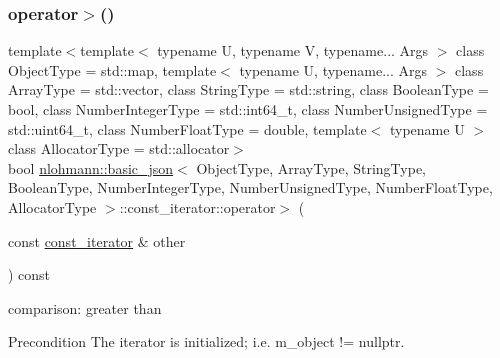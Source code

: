 \subsubsection{\texorpdfstring{operator$>$()}{operator>()}}
{\footnotesize\ttfamily template$<$template$<$ typename U, typename V, typename... Args $>$ class Object\+Type = std\+::map, template$<$ typename U, typename... Args $>$ class Array\+Type = std\+::vector, class String\+Type  = std\+::string, class Boolean\+Type  = bool, class Number\+Integer\+Type  = std\+::int64\+\_\+t, class Number\+Unsigned\+Type  = std\+::uint64\+\_\+t, class Number\+Float\+Type  = double, template$<$ typename U $>$ class Allocator\+Type = std\+::allocator$>$ \\
bool \hyperlink{classnlohmann_1_1basic__json}{nlohmann\+::basic\+\_\+json}$<$ Object\+Type, Array\+Type, String\+Type, Boolean\+Type, Number\+Integer\+Type, Number\+Unsigned\+Type, Number\+Float\+Type, Allocator\+Type $>$\+::const\+\_\+iterator\+::operator$>$ (\begin{DoxyParamCaption}\item[{const \hyperlink{classnlohmann_1_1basic__json_1_1const__iterator}{const\+\_\+iterator} \&}]{other }\end{DoxyParamCaption}) const\hspace{0.3cm}{\ttfamily [inline]}}



comparison\+: greater than 

\begin{DoxyPrecond}{Precondition}
The iterator is initialized; i.\+e. {\ttfamily m\+\_\+object != nullptr}. 
\end{DoxyPrecond}
\mbox{\label{classnlohmann_1_1basic__json_1_1const__iterator_a1ed92c14d88b802345bd15417a417a5d}} 
